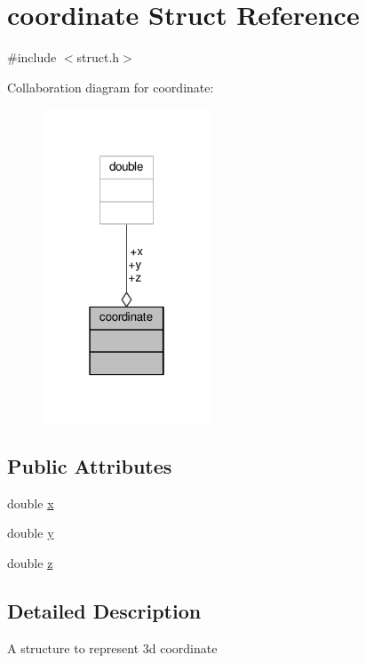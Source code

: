\hypertarget{structcoordinate}{}\section{coordinate Struct Reference}
\label{structcoordinate}


{\ttfamily \#include $<$struct.\+h$>$}



Collaboration diagram for coordinate\+:
\nopagebreak
\begin{figure}[H]
\begin{center}
\leavevmode
\includegraphics[width=142pt]{structcoordinate__coll__graph}
\end{center}
\end{figure}
\subsection*{Public Attributes}
\begin{DoxyCompactItemize}
\item 
double \hyperlink{structcoordinate_a3a164e660f2488a90d90f349d3b02010}{x}
\item 
double \hyperlink{structcoordinate_a11b4100f0f7449334bd3957db9be03cc}{y}
\item 
double \hyperlink{structcoordinate_a3f539772abb900009e378d254cb7b3c1}{z}
\end{DoxyCompactItemize}


\subsection{Detailed Description}
A structure to represent 3d coordinate 


